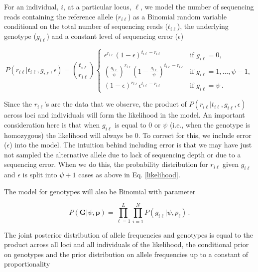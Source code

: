 \documentclass[11pt,english,letterpaper,oneside]{article}
\begin{document}
\noindent For an individual, $i$, at a particular locus, $\ell$, we model the number of sequencing reads containing the reference allele ($r_{i\ell}$) as a Binomial random variable conditional on the total number of sequencing reads ($t_{i\ell} $), the underlying genotype ($g_{i\ell}$) and a constant level of sequencing error ($\epsilon$)

\begin{equation}\label{likelihood}
P(r_{i \ell}|t_{i\ell}, g_{i \ell},\epsilon) = \binom{t_{i \ell}}{r_{i \ell}}
	\begin{cases}
	\epsilon^{r_{i \ell}}(1-\epsilon)^{t_{i \ell}-r_{i \ell}} & \text{if  } g_{i \ell} = 0, \\[0.05in]
	\left(\frac{g_{i \ell}}{\psi}\right)^{r_{i \ell}}\left(1-\frac{g_{i \ell}}{\psi}\right)^{t_{i \ell}-r_{i \ell}} & \text{if  } g_{i \ell} = 1,\ldots,\psi-1, \\[0.05in]
	(1-\epsilon)^{r_{i \ell}}\epsilon^{t_{i \ell}-r_{i \ell}} & \text{if  } g_{i \ell} = \psi\,.
	\end{cases}
\end{equation}


\noindent Since the $r_{i \ell}$'s are the data that we observe, the product of $P(r_{i \ell}|t_{i\ell}, g_{i \ell},\epsilon)$ across loci and individuals will form the likelihood in the model. An important consideration here is that when $g_{i \ell}$ is equal to 0 or $\psi$ (i.e., when the genotype is homozygous) the likelihood will always be 0. To correct for this, we include error ($\epsilon$) into the model. The intuition behind including error is that we may have just not sampled the alternative allele due to lack of sequencing depth or due to a sequencing error. When we do this, the probability distribution for $r_{i\ell}$ given $g_{i\ell}$ and $\epsilon$ is split into $\psi+1$ cases as above in Eq. \ref{likelihood}.


The model for genotypes will also be Binomial with parameter

\begin{equation}\label{condl_prior}
P(\bm{G}|\psi, \bm{p}) = \displaystyle\prod_{\ell=1}^L\displaystyle\prod_{i=1}^N P(g_{i \ell}|\psi, p_{\ell})\,.
\end{equation}

The joint posterior distribution of allele frequencies and genotypes is equal to the product across all loci and all individuals of the likelihood, the conditional prior on genotypes and the prior distribution on allele frequencies up to a constant of proportionality
\end{document}
